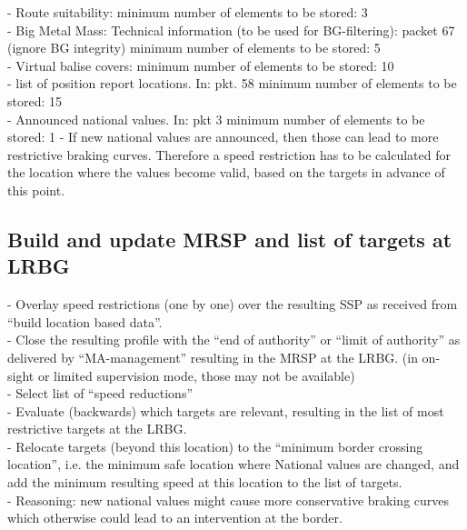 \documentclass{template/openetcs_report}
\begin{document}
- Route suitability: minimum number of elements to be stored: 3\\
- Big Metal Mass: Technical information (to be used for \gls{BG}-filtering): packet 67 (ignore \gls{BG} integrity)  minimum number of elements to be stored: 5\\
- Virtual balise covers:  minimum number of elements to be stored: 10\\
- list of position report locations. In: pkt. 58  minimum number of elements to be stored: 15\\
- Announced national values.  In: pkt 3 minimum number of elements to be stored: 1
- If new national values are announced, then those can lead to more restrictive braking curves. Therefore a speed restriction has to be calculated for the location where the values become valid, based on the targets in advance of this point. \\

\subsection{Build and update MRSP and list of targets at LR\gls{BG}}
- Overlay speed restrictions (one by one) over the resulting SSP as received from “build location based data”.\\
- Close the resulting profile with the “end of authority” or “limit of authority” as delivered by “MA-management” resulting in the MRSP at the LR\gls{BG}.
(in on-sight or limited supervision mode, those may not be available)\\
- Select list of “speed reductions”\\
- Evaluate (backwards) which targets are relevant, resulting in the list of most restrictive targets at the LR\gls{BG}.\\
- Relocate targets (beyond this location) to the “minimum border crossing location”, i.e. the minimum safe location where National values are changed, and add the minimum resulting speed at this location to the list of targets.\\
- Reasoning:  new national values might cause more conservative braking curves which otherwise could lead to an intervention at the border.\\
\end{document}

